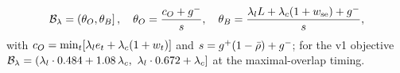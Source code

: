 
\begin{equation}
\mathcal B_{\lambda}=\left(\theta_O,\theta_B\right],\quad
\theta_O=\frac{c_O+g^{-}}{s},\quad \theta_B=\frac{\lambda_l L+\lambda_c(1+w_{\mathrm{se}})+g^{-}}{s},
\label{eq:band}
\end{equation}
with $c_O=\min_t[\lambda_l e_t+\lambda_c(1+w_t)]$ and $s=g^{+}(1-\bar\rho)+g^{-}$; for
the v1 objective $\mathcal B_\lambda=(\lambda_l\cdot0.484+1.08\,\lambda_c,\ \lambda_l\cdot0.672+\lambda_c]$ at
the maximal-overlap timing.

